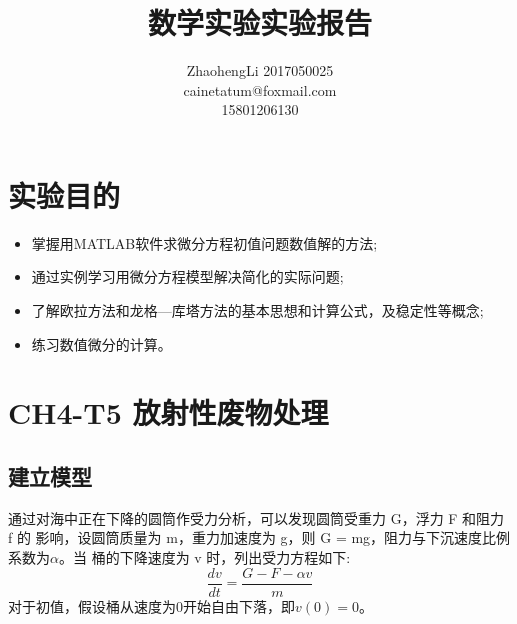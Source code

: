 \documentclass{article}
\title{数学实验实验报告}
\author{ZhaohengLi 2017050025\\cainetatum@foxmail.com\\15801206130}
\begin{document}
\maketitle
\section{实验目的}
\begin{itemize}
	\item{掌握用MATLAB软件求微分方程初值问题数值解的方法;}
	\item{通过实例学习用微分方程模型解决简化的实际问题;}
	\item{了解欧拉方法和龙格—库塔方法的基本思想和计算公式，及稳定性等概念;}
	\item{练习数值微分的计算。}
\end{itemize}

\newpage
\section{CH4-T5 放射性废物处理}

\subsection{建立模型}
通过对海中正在下降的圆筒作受力分析，可以发现圆筒受重力 G，浮力 F 和阻力 f 的 影响，设圆筒质量为 m，重力加速度为 g，则 G = mg，阻力与下沉速度比例系数为$\alpha$。当 桶的下降速度为 v 时，列出受力方程如下:
$$\frac{dv}{dt}=\frac{G-F-\alpha v}{m}$$
对于初值，假设桶从速度为0开始自由下落，即$v(0)=0$。
\end{document}
